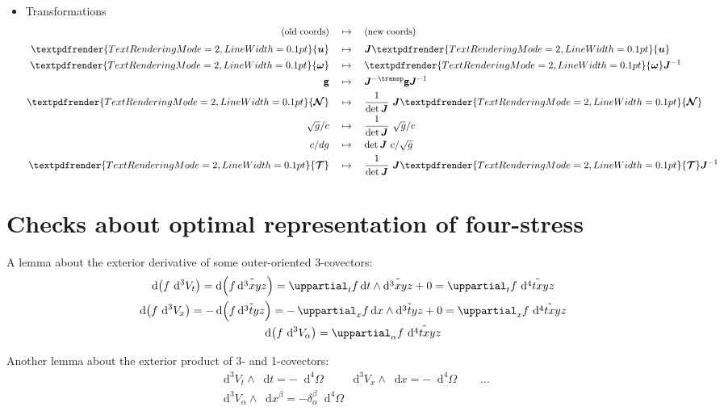\documentclass[a4paper,12pt,%
onecolumn,oneside,article,%
british%
]{memoir}
\theoremstyle{remark}
\theoremstyle{innote}
\newcommand*{\mathte}[1]{\bm{\mathsf{#1}}}
\newcommand*{\xbm}[1]{\textpdfrender{TextRenderingMode=2,LineWidth=0.1pt}{\boldsymbol{#1}}}
\newcommand*{\de}{\mathop{}\!\uppartial}%
\newcommand*{\di}{\mathop{}\!\mathrm{d}}%
\renewcommand*{\|}[1][]{\nonscript\:#1\vert\nonscript\:\mathopen{}}
\newcommand*{\iT}{^{-\transp}}%
\newcommand*{\se}[1]{\de_{#1}}
\newcommand*{\si}[1]{\di{#1}}
\newcommand*{\sssi}[1]{\di^{3}{#1}}
\newcommand*{\ssssi}[1]{\di^{4}{#1}}
\newcommand*{\tw}[1]{\tilde{#1}}
\newcommand*{\ttti}[1]{\di^{3}V_{#1}}
\newcommand*{\tttti}[1]{\di^{4}\varOmega_{#1}}
\newcommand*{\yg}{\mathte{g}}
\newcommand*{\dg}{\sqrt{g}}
\newcommand*{\yN}{\xbm{\mathcal{N}}}
\newcommand*{\yTT}{\xbm{\mathcal{T}}}
\newcommand*{\yu}{\xbm{u}}
\newcommand*{\yo}{\xbm{\omega}}
\newcommand*{\yJ}{\bm{J}}
\begin{document}
\begin{itemize}
\item Transformations
  \begin{subequations}
  \begin{align}
    \text{\small(old coords)} &\quad\mapsto\quad\text{\small(new coords)}\notag
    \\[\jot]
    \yu &\quad\mapsto\quad \yJ\yu
    \\
    \yo &\quad\mapsto\quad \yo\yJ^{-1}
    \\
    \yg &\quad\mapsto\quad \yJ\iT\yg\yJ^{-1}
    \\
    \yN &\quad\mapsto\quad \frac{1}{\det\yJ}\ \yJ\yN
    \\
    \dg/c &\quad\mapsto\quad \frac{1}{\det\yJ}\ \dg/c
    \\
    c/dg &\quad\mapsto\quad \det\yJ\ c/\dg
    \\
    \yTT &\quad\mapsto\quad \frac{1}{\det\yJ}\ \yJ\yTT\yJ^{-1}
  \end{align}
  \end{subequations}

\end{itemize}
\section{Checks about optimal representation of four-stress}
\label{sec:checks_4stress}

A lemma about the exterior derivative of some outer-oriented 3-covectors:
\begin{equation}
  \label{eq:d_3cov}
  \begin{gathered}
    \di\bigl(f\,\ttti{t}\bigr) =
    \di\Bigl( f\,\tw{\sssi{xyz}}\Bigr) =
    \se{t}f \di t \land \tw{\sssi{xyz}} + 0
    = \se{t}f\ \tw{\ssssi{txyz}}
    \\
    \di\bigl(f\,\ttti{x}\bigr) =
    -\di\Bigl( f\,\tw{\sssi{tyz}}\Bigr) =
    -\se{x}f \di x \land \tw{\sssi{tyz}} + 0
    = \se{x}f\ \tw{\ssssi{txyz}}
    \\
    \di\bigl(f\,\ttti{\alpha}\bigr) =
    \se{\alpha}f\ \tw{\ssssi{txyz}}
  \end{gathered}
\end{equation}

Another lemma about the exterior product of 3- and 1-covectors:
\begin{equation}
  \label{eq:d_3ext1cov}
  \begin{gathered}
    \ttti{t} \land \si{t} = - \tttti{}
    \qquad
    \ttti{x} \land \si{x} = - \tttti{}
    \qquad
    \dotso
    \\
    \ttti{\alpha} \land \si{x^{\beta}} = - \delta_{\alpha}^{\beta}\tttti{}
  \end{gathered}
\end{equation}
\end{document}
